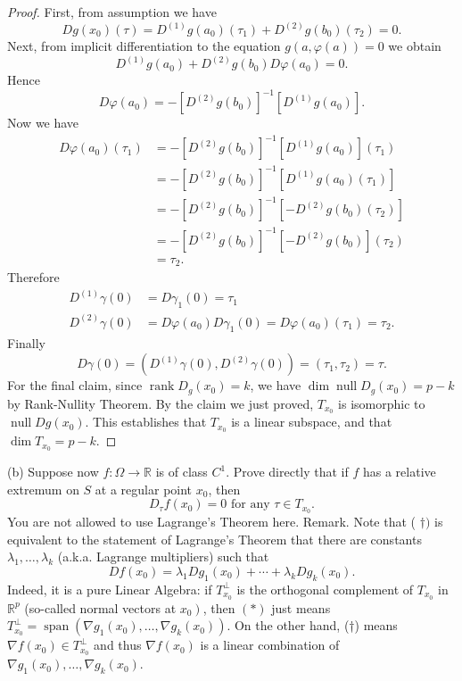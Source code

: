 \begin{proof}
	First, from assumption we have
	\[
		Dg (x_0) (\tau) = 
		D^{(1)} g(a_0) (\tau_1) + 
		D^{(2)} g(b_0) (\tau_2)
		= 0
	.\] 
	Next, from implicit differentiation to the equation $g(a, \varphi(a)) = 0$ we obtain
	\[
		D^{(1)}g(a_0) + D^{(2)}g(b_0) D\varphi(a_0) = 0
	.\] 
	Hence 
	\[
		D \varphi(a_0) = - \left[ D^{(2)}g(b_0) \right] ^{-1} \left[ D^{(1)}g(a_0) \right] 
	.\] 
	Now we have
	\begin{align*}
		D\varphi(a_0)(\tau_1) &= - \left[ D^{(2)}g(b_0) \right] ^{-1} \left[ D^{(1)}g(a_0) \right](\tau_1) \\
		&= - \left[ D^{(2)}g(b_0) \right] ^{-1} \left[ D^{(1)}g(a_0)(\tau_1) \right] \\
		&= - \left[ D^{(2)}g(b_0) \right] ^{-1} \left[ - D^{(2)}g(b_0)(\tau_2) \right] \\
		&= - \left[ D^{(2)}g(b_0) \right] ^{-1} \left[ - D^{(2)}g(b_0) \right](\tau_2) \\
		&= \tau_2 
	.\end{align*} 
	Therefore
	\begin{align*}
		D^{(1)}\gamma(0) &= D \gamma_1(0) = \tau_1\\
		D^{(2)}\gamma(0) &= D\varphi(a_0)D \gamma_1(0) = D \varphi(a_0)(\tau_1) = \tau_2
	.\end{align*}
	Finally
	\[
		D\gamma(0) = \left(D^{(1)}\gamma(0), D^{(2)}\gamma(0)\right) = (\tau_1, \tau_2) = \tau
	.\] 
	For the final claim, since $\operatorname{rank} D_g(x_0) = k$, we have $\operatorname{dim} \operatorname{null} D_g(x_0) = p - k $ by Rank-Nullity Theorem. By the claim we just proved, $T_{x_0}$ is isomorphic to $\operatorname{null} Dg(x_0)$. This establishes that $T_{x_0}$ is a linear subspace, and that $\operatorname{dim} T_{x_0} = p - k $.
\end{proof}
\newpage
(b) Suppose now $f: \Omega \rightarrow \mathbb{R}$ is of class $C^1$. Prove directly that if $f$ has a relative extremum on $S$ at a regular point $x_0$, then
\[
D_\tau f\left(x_0\right)=0 \text { for any } \tau \in T_{x_0} .
\]
You are not allowed to use Lagrange's Theorem here.
Remark. Note that ( $\dagger)$ is equivalent to the statement of Lagrange's Theorem that there are constants $\lambda_1, \ldots, \lambda_k$ (a.k.a. Lagrange multipliers) such that
\[
D f\left(x_0\right)=\lambda_1 D g_1\left(x_0\right)+\cdots+\lambda_k D g_k\left(x_0\right) .
\]
Indeed, it is a pure Linear Algebra: if $T_{x_0}^{\perp}$ is the orthogonal complement of $T_{x_0}$ in $\mathbb{R}^p$ (so-called normal vectors at $\left.x_0\right)$, then $(*)$ just means $T_{x_0}^{\perp}=\operatorname{span}\left(\nabla g_1\left(x_0\right), \ldots, \nabla g_k\left(x_0\right)\right)$. On the other hand, (†) means $\nabla f\left(x_0\right) \in T_{x_0}^{\perp}$ and thus $\nabla f\left(x_0\right)$ is a linear combination of $\nabla g_1\left(x_0\right), \ldots, \nabla g_k\left(x_0\right)$.
